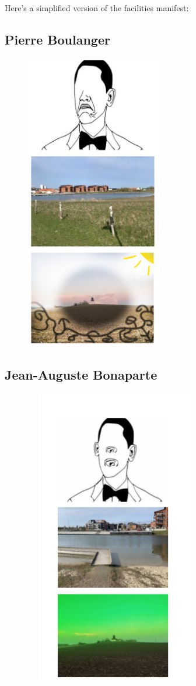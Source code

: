 \documentclass{article}
\begin{document}
Here's a simplified version of the facilities manifest:

\subsection*{Pierre Boulanger}
\includegraphics[width=8cm,height=13cm]{Pierre_Boulanger.png}
\newpage
\BgThispage
\thispagestyle{empty}
\subsection*{Jean-Auguste Bonaparte}
\includegraphics[width=10cm,height=13cm]{Jean_Auguste_Bonaparte.png}
\newpage
\BgThispage
\thispagestyle{empty}
\end{document}
